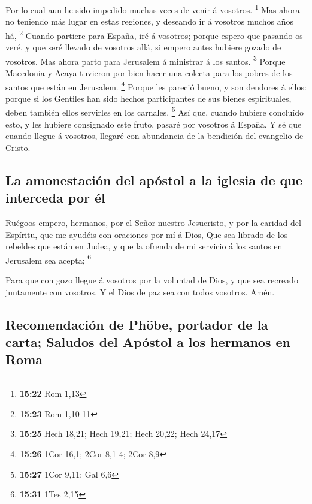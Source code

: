  Por lo cual aun he sido impedido muchas veces de venir á
vosotros. \footnote{\textbf{15:22} Rom 1,13}  Mas ahora no
teniendo más lugar en estas regiones, y deseando ir á vosotros muchos
años há, \footnote{\textbf{15:23} Rom 1,10-11}  Cuando
partiere para España, iré á vosotros; porque espero que pasando os veré,
y que seré llevado de vosotros allá, si empero antes hubiere gozado de
vosotros.  Mas ahora parto para Jerusalem á ministrar á los
santos. \footnote{\textbf{15:25} Hech 18,21; Hech 19,21; Hech 20,22;
  Hech 24,17}  Porque Macedonia y Acaya tuvieron por bien
hacer una colecta para los pobres de los santos que están en Jerusalem.
\footnote{\textbf{15:26} 1Cor 16,1; 2Cor 8,1-4; 2Cor 8,9} 
Porque les pareció bueno, y son deudores á ellos: porque si los Gentiles
han sido hechos participantes de sus bienes espirituales, deben también
ellos servirles en los carnales. \footnote{\textbf{15:27} 1Cor 9,11; Gal
  6,6}  Así que, cuando hubiere concluído esto, y les
hubiere consignado este fruto, pasaré por vosotros á España.
 Y sé que cuando llegue á vosotros, llegaré con abundancia
de la bendición del evangelio de Cristo.

\hypertarget{la-amonestaciuxf3n-del-apuxf3stol-a-la-iglesia-de-que-interceda-por-uxe9l}{%
\subsection{La amonestación del apóstol a la iglesia de que interceda
por
él}\label{la-amonestaciuxf3n-del-apuxf3stol-a-la-iglesia-de-que-interceda-por-uxe9l}}

 Ruégoos empero, hermanos, por el Señor nuestro Jesucristo,
y por la caridad del Espíritu, que me ayudéis con oraciones por mí á
Dios,  Que sea librado de los rebeldes que están en Judea,
y que la ofrenda de mi servicio á los santos en Jerusalem sea acepta;
\footnote{\textbf{15:31} 1Tes 2,15}

 Para que con gozo llegue á vosotros por la voluntad de
Dios, y que sea recreado juntamente con vosotros.  Y el
Dios de paz sea con todos vosotros. Amén.

\hypertarget{recomendaciuxf3n-de-phuxf6be-portador-de-la-carta-saludos-del-apuxf3stol-a-los-hermanos-en-roma}{%
\subsection{Recomendación de Phöbe, portador de la carta; Saludos del
Apóstol a los hermanos en
Roma}\label{recomendaciuxf3n-de-phuxf6be-portador-de-la-carta-saludos-del-apuxf3stol-a-los-hermanos-en-roma}}

